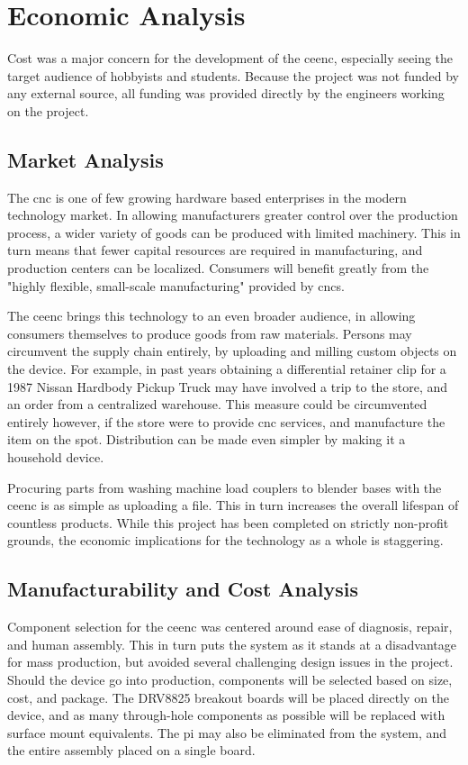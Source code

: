 \chapter{Economic Analysis}

Cost was a major concern for the development of the \gls{ceenc}, especially seeing the target audience of hobbyists and students.
Because the project was not funded by any external source, all funding was provided directly by the engineers working on the project.

\section{Market Analysis}
The \gls{cnc} is one of few growing hardware based enterprises in the modern technology market.
In allowing manufacturers greater control over the production process, a wider variety of goods can be produced with limited machinery.
This in turn means that fewer capital resources are required in manufacturing, and production centers can be localized.
Consumers will benefit greatly from the "highly flexible, small-scale manufacturing"\cite{3dprintimpact} provided by \gls{cnc}s.

The \gls{ceenc} brings this technology to an even broader audience, in allowing consumers themselves to produce goods from raw materials.
Persons may circumvent the supply chain entirely, by uploading and milling custom objects on the device.\cite{3dprintsave}
For example, in past years obtaining a differential retainer clip for a 1987 Nissan Hardbody Pickup Truck may have involved a trip to the store, and an order from a centralized warehouse.
This measure could be circumvented entirely however, if the store were to provide \gls{cnc} services, and manufacture the item on the spot. 
Distribution can be made even simpler by making it a household device.

Procuring parts from washing machine load couplers to blender bases with the \gls{ceenc} is as simple as uploading a file.
This in turn increases the overall lifespan of countless products.
While this project has been completed on strictly non-profit grounds, the economic implications for the technology as a whole is staggering.

\section{Manufacturability and Cost Analysis}
Component selection for the \gls{ceenc} was centered around ease of diagnosis, repair, and human assembly.
This in turn puts the system as it stands at a disadvantage for mass production, but avoided several challenging design issues in the project.
Should the device go into production, components will be selected based on size, cost, and package. 
The DRV8825 breakout boards will be placed directly on the device, and as many through-hole components as possible will be replaced with surface mount equivalents.
The \gls{pi} may also be eliminated from the system, and the entire assembly placed on a single board.

